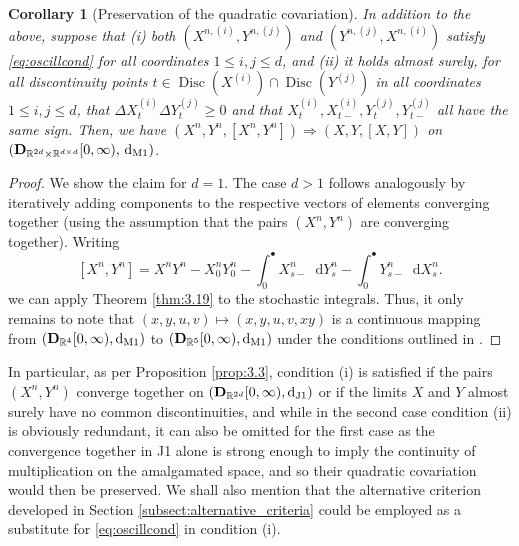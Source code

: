 \documentclass[11pt]{article}
\newtheorem{cor}[theorem]{Corollary}
\theoremstyle{definition}\newtheorem{example}[theorem]{Example}
\theoremstyle{definition}\newtheorem{counterexample}[theorem]{Counterexample}
\theoremstyle{definition}\newtheorem{remark}[theorem]{Remark}
\theoremstyle{definition}\newtheorem{defi}[theorem]{Definition}
\numberwithin{equation}{section}
\newcommand{\R}{\mathbb{R}}
\newcommand{\D}{{\bf D}}											%
\newcommand*\diff{\mathop{}\!\mathrm{d}}								%
\renewcommand{\|}{\; : \, \;}											%
\newcommand{\dJ}{\diff_{\operatorname{J1}}}								%
\newcommand{\dM}{\diff_{\operatorname{M1}}}							%
\begin{document}
\begin{cor}[Preservation of the quadratic covariation] \label{prop:preserv_quad_var} In addition to the above, suppose that (i) both $(X^{n,(i)},Y^{n,(j)})$ and $(Y^{n,(j)},X^{n,(i)})$ satisfy \eqref{eq:oscillcond} for all coordinates $1\le i,j\le d$, and (ii) it holds almost surely, for all discontinuity points $t \in \operatorname{Disc}(X^{(i)})  \cap  \operatorname{Disc}(Y^{(j)})$ in all coordinates $1\le i,j\le d$, that $\Delta X^{(i)}_t \Delta Y^{(j)}_t\ge 0$ and that $X^{(i)}_t,X^{(i)}_{t-},Y^{(j)}_t, Y^{(j)}_{t-}$ all have the same sign. Then, we have $(X^n,Y^n,[X^n,Y^n])\Rightarrow (X,Y,[X,Y])$ on $(\D_{\R^{2d}\times \mathbb{R}^{d\times d}}[0,\infty), \, \dM)$.
\end{cor}
\begin{proof} We show the claim for $d=1$. The case $d>1$ follows analogously by iteratively adding components to the respective vectors of elements converging together (using the assumption that the pairs $(X^n,Y^n)$ are converging together). Writing
	\[
	[X^n,Y^n]=X^nY^n - X^n_0Y_0^n - \int_0^\bullet X^n_{s-} \diff Y^n_s - \int_0^\bullet Y^n_{s-} \diff X^n_{s}.
	\]
	we can apply Theorem \ref{thm:3.19} to the stochastic integrals. Thus, it only remains to note that $(x,y,u,v)\mapsto (x,y,u,v,xy)$ is a continuous mapping from $(\D_{\R^4}[0,\infty),\dM)$ to $(\D_{\R^{5}}[0,\infty),\dM)$ under the conditions outlined in \cite[Thm.~13.3.2]{whitt}.
\end{proof}


In particular, as per Proposition \ref{prop:3.3}, condition (i) is satisfied if the pairs $(X^n,Y^n)$ converge together on $(\D_{\R^{2d}}[0,\infty), \dJ)$ or if the limits $X$ and $Y$ almost surely have no common discontinuities, and while in the second case condition (ii) is obviously redundant, it can also be omitted for the first case as the convergence together in J1 alone is strong enough to imply the continuity of multiplication on the amalgamated space, and so their quadratic covariation would then be preserved. We shall also mention that the alternative criterion developed in Section \ref{subsect:alternative_criteria} could be employed as a substitute for \eqref{eq:oscillcond} in condition (i).
\end{document}
